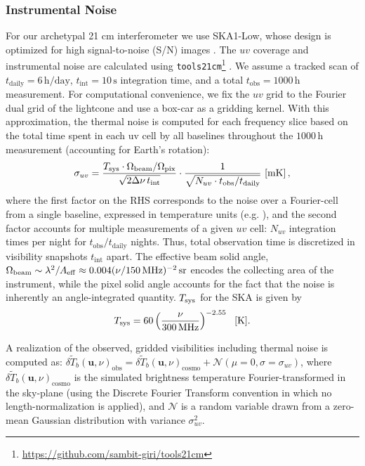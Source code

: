 \documentclass[fleqn,usenatbib]{mnras}
\renewcommand{\b}{\mathbf}
\begin{document}
\subsubsection{Instrumental Noise}
For our archetypal 21 cm interferometer we use SKA1-Low, whose design is optimized for high signal-to-noise (S/N) images \citep{dewdney2013ska1}.
The $uv$ coverage and instrumental noise are  calculated using \texttt{tools21cm}\footnote{\url{https://github.com/sambit-giri/tools21cm}} \citep{giri2018,giri2020}. We assume a tracked scan of $t_{\mathrm{daily}} = 6 \, \mathrm{h/day}$, $t_{\mathrm{int}} = 10 \, \mathrm{s}$ integration time, and a total $t_{\mathrm{obs}} = 1000 \, \mathrm{h}$ measurement.
For computational convenience, we fix the $uv$ grid to the Fourier dual grid of the lightcone and use a box-car as a gridding kernel.
With this approximation, the thermal noise is computed for each frequency slice based on the total time spent in each uv cell by all baselines throughout the $1000\,\mathrm{h}$ measurement (accounting for Earth's rotation):
\begin{equation}
\label{eq:noise}
    \sigma_{uv} = 
    \frac{T_{\rm sys}\cdot \Omega_{\rm beam} / \Omega_{\rm pix}}{\sqrt{2 \Delta \nu \,t_{\rm int}} }
    \cdot
    \frac{1}{\sqrt{N_{uv} \cdot t_{\mathrm{obs}} / t_{\mathrm{daily}}}} \,\,{\rm [mK]} \, ,
\end{equation}
where the first factor on the RHS corresponds to the noise over a Fourier-cell from a single baseline, expressed in temperature units (e.g. \citealt{parsons12}), and the second factor accounts for multiple measurements of a given $uv$ cell: $N_{uv}$ integration times per night for $ t_{\mathrm{obs}} / t_{\mathrm{daily}}$ nights. Thus, total observation time is discretized in visibility snapshots $t_\mathrm{int}$ apart.
The effective beam solid angle, $\Omega_{\rm beam} \sim \lambda^2 / A_{\rm eff} \approx 0.004 (\nu/150\, {\rm MHz})^{-2}\, {\rm sr}$ encodes the collecting area of the instrument, while the pixel solid angle accounts for the fact that the noise is inherently an angle-integrated quantity.
$T_{\rm sys}$ for the SKA is given by
\begin{equation}
    T_{\rm sys} = 60 \left(\frac{\nu}{300\,{\rm MHz}}\right)^{-2.55}\ \ [{\rm K}].
\end{equation}

A realization of the observed, gridded visibilities including thermal noise is computed as: $\delta\widetilde{T}_b (\b{u}, \nu)_\mathrm{obs} = \delta\widetilde{T}_b (\b{u}, \nu)_\mathrm{cosmo} + \mathcal{N}(\mu = 0, \sigma = \sigma_{uv})$, where $\delta\widetilde{T}_b (\b{u}, \nu)_\mathrm{cosmo}$ is the simulated brightness temperature Fourier-transformed in the sky-plane (using the Discrete Fourier Transform convention in which no length-normalization is applied), and $\mathcal{N}$ is a random variable drawn from a zero-mean Gaussian distribution with variance $\sigma^2_{uv}$.
\end{document}
